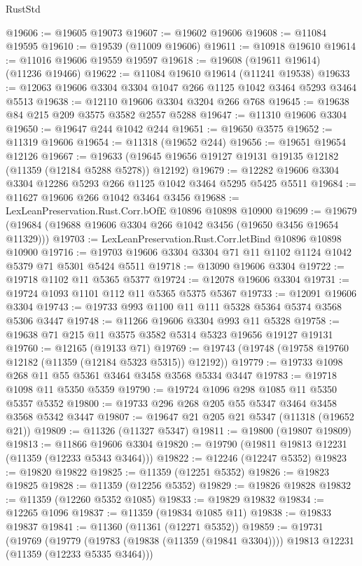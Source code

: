 \begin{lexlean}{RustStd}
\begin{coremodule}
{{{{{{{{{{{{{{{{{{{@19606 := @19605 @19073
@19607 := @19602 @19606
@19608 := @11084 @19595
@19610 := @19539 (@11009 @19606)
@19611 := @10918 @19610
@19614 := @11016 @19606 @19559 @19597
@19618 := @19608 (@19611 @19614) (@11236 @19466)
@19622 := @11084 @19610 @19614 (@11241 @19538)
@19633 := @12063 @19606 @3304 @3304 @1047 @266 @1125 @1042 @3464 @5293 @3464 @5513
@19638 := @12110 @19606 @3304 @3204 @266 @768
@19645 := @19638 @84 @215 @209 @3575 @3582 @2557 @5288
@19647 := @11310 @19606 @3304
@19650 := @19647 @244 @1042 @244
@19651 := @19650 @3575
@19652 := @11319 @19606
@19654 := @11318 (@19652 @244)
@19656 := @19651 @19654 @12126
@19667 := @19633 (@19645 @19656 @19127 @19131 @19135 @12182 (@11359 (@12184 @5288 @5278)) @12192)
@19679 := @12282 @19606 @3304 @3304 @12286 @5293 @266 @1125 @1042 @3464 @5295 @5425 @5511
@19684 := @11627 @19606 @266 @1042 @3464 @3456
@19688 := LexLeanPreservation.Rust.Corr.bOfE @10896 @10898 @10900
@19699 := @19679 (@19684 (@19688 @19606 @3304 @266 @1042 @3456 (@19650 @3456 @19654 @11329)))
@19703 := LexLeanPreservation.Rust.Corr.letBind @10896 @10898 @10900
@19716 := @19703 @19606 @3304 @3304 @71 @11 @1102 @1124 @1042 @5379 @71 @5301 @5424 @5511
@19718 := @13090 @19606 @3304
@19722 := @19718 @1102 @11 @5365 @5377
@19724 := @12078 @19606 @3304
@19731 := @19724 @1093 @1101 @112 @11 @5365 @5375 @5367
@19733 := @12091 @19606 @3304
@19743 := @19733 @993 @1100 @11 @111 @5328 @5364 @5374 @3568 @5306 @3447
@19748 := @11266 @19606 @3304 @993 @11 @5328
@19758 := @19638 @71 @215 @11 @3575 @3582 @5314 @5323 @19656 @19127 @19131
@19760 := @12165 (@19133 @71)
@19769 := @19743 (@19748 (@19758 @19760 @12182 (@11359 (@12184 @5323 @5315)) @12192))
@19779 := @19733 @1098 @268 @11 @55 @5361 @3464 @3458 @3568 @5334 @3447
@19783 := @19718 @1098 @11 @5350 @5359
@19790 := @19724 @1096 @298 @1085 @11 @5350 @5357 @5352
@19800 := @19733 @296 @268 @205 @55 @5347 @3464 @3458 @3568 @5342 @3447
@19807 := @19647 @21 @205 @21 @5347 (@11318 (@19652 @21))
@19809 := @11326 (@11327 @5347)
@19811 := @19800 (@19807 @19809)
@19813 := @11866 @19606 @3304
@19820 := @19790 (@19811 @19813 @12231 (@11359 (@12233 @5343 @3464)))
@19822 := @12246 (@12247 @5352)
@19823 := @19820 @19822
@19825 := @11359 (@12251 @5352)
@19826 := @19823 @19825
@19828 := @11359 (@12256 @5352)
@19829 := @19826 @19828
@19832 := @11359 (@12260 @5352 @1085)
@19833 := @19829 @19832
@19834 := @12265 @1096
@19837 := @11359 (@19834 @1085 @11)
@19838 := @19833 @19837
@19841 := @11360 (@11361 (@12271 @5352))
@19859 := @19731
    (@19769
      (@19779 (@19783 (@19838 (@11359 (@19841 @3304)))) @19813 @12231 (@11359 (@12233 @5335 @3464)))
}}}}}}}}}}}}}}}}}}}
\end{coremodule}
\end{lexlean}
